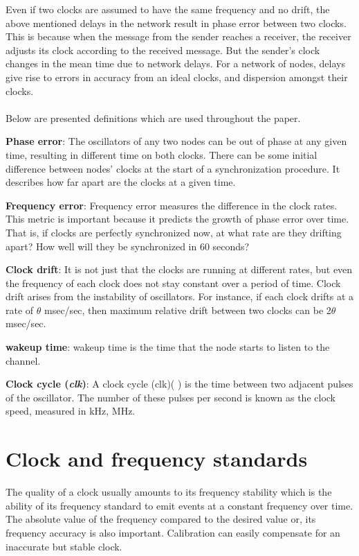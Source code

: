 \documentclass[a4paper,10pt]{report}
\begin{document}
Even if two clocks are assumed to have the same frequency and no drift, the above mentioned delays in the network result in phase
error between two clocks. This is because when the message from the sender reaches a receiver, the receiver adjusts its clock according to the received message. But the sender's clock changes in the mean time due to network delays. For a network of nodes, delays give rise to errors in accuracy from an ideal clocks, and dispersion amongst their clocks. \paragraph*{}
     Below are presented definitions which are used throughout the paper.
\begin{description}
\item \textbf{Phase error}: The oscillators of any two nodes can be out of phase at any given time, resulting in different time on both clocks. There can be some initial difference between nodes' clocks at the start of a synchronization procedure. It describes how far apart are the clocks at a given time.
\item \textbf{Frequency error}: Frequency error measures the difference in the clock rates. This metric is important because it predicts the growth of phase error over time. That is, if clocks are perfectly synchronized now, at what rate are they drifting apart? How well will they be synchronized in 60 seconds?
\item \textbf{Clock drift}: It is not just that the clocks are running at different rates, but even the frequency of each clock does not stay constant over a period of time. Clock drift arises from the instability of oscillators. For instance, if each clock drifts at a rate of $\theta$ msec/sec, then maximum relative drift between two clocks can be 2$\theta$ msec/sec.
\item \textbf{wakeup time}: wakeup time  is the time that the node starts to listen to the channel.
\item \textbf{Clock cycle (\textit{clk})}: A clock cycle (clk)( )
is the time between two adjacent pulses of the oscillator. The number of these pulses per second is known as the clock speed, measured in kHz, MHz.
\end{description}
\section{\textbf{Clock and frequency standards}}\par
The quality of a clock usually amounts to its frequency stability which is the ability of its frequency standard to emit
events at a constant frequency over time. The absolute value of the frequency compared to the desired value or, its frequency accuracy
is also important. Calibration can easily compensate for an inaccurate but stable clock.
\end{document}
